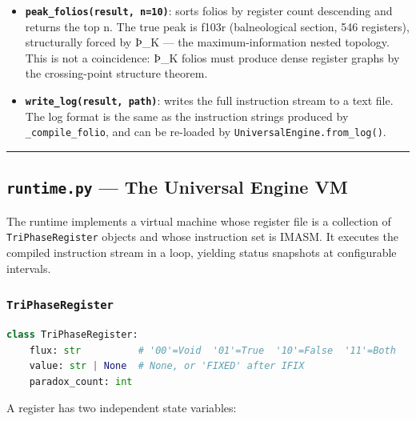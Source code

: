 \documentclass[12pt,a4paper]{article}
\begin{document}
\begin{itemize}
    \item \textbf{\texttt{peak\_folios(result, n=10)}}: sorts folios by register count descending and returns the top n. The true peak is f103r (balneological section, 546 registers), structurally forced by Þ\_K --- the maximum-information nested topology. This is not a coincidence: Þ\_K folios must produce dense register graphs by the crossing-point structure theorem.
    \item \textbf{\texttt{write\_log(result, path)}}: writes the full instruction stream to a text file. The log format is the same as the instruction strings produced by \texttt{\_compile\_folio}, and can be re-loaded by \texttt{UniversalEngine.from\_log()}.
\end{itemize}

\begin{center}
\rule{0.5\textwidth}{0.4pt}
\end{center}

\subsection{\texttt{runtime.py} --- The Universal Engine VM}

The runtime implements a virtual machine whose register file is a collection of \texttt{TriPhaseRegister} objects and whose instruction set is IMASM. It executes the compiled instruction stream in a loop, yielding status snapshots at configurable intervals.

\subsubsection{\texttt{TriPhaseRegister}}

\begin{lstlisting}[language=Python]
class TriPhaseRegister:
    flux: str          # '00'=Void  '01'=True  '10'=False  '11'=Both
    value: str | None  # None, or 'FIXED' after IFIX
    paradox_count: int
\end{lstlisting}

A register has two independent state variables:
\end{document}
